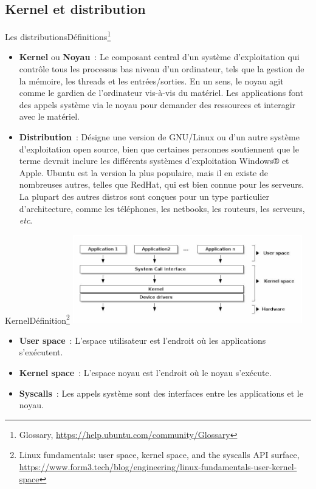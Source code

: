 \documentclass{beamer}
\begin{document}
    \subsection{Kernel et distribution}\label{subsec:kernel-et-distribution}

    \begin{frame}{Les distributions}{Définitions\footnote{Glossary, \url{https://help.ubuntu.com/community/Glossary}}}
        \begin{itemize}
            \item \textbf{Kernel} ou \textbf{Noyau}~: Le composant central d'un système d'exploitation qui contrôle tous les processus bas niveau d'un ordinateur, tels que la gestion de la mémoire, les threads et les entrées/sorties.
            En un sens, le noyau agit comme le gardien de l'ordinateur vis-à-vis du matériel.
            Les applications font des appels système via le noyau pour demander des ressources et interagir avec le matériel.
            \item \textbf{Distribution}~: Désigne une version de GNU/Linux ou d'un autre système d'exploitation open source, bien que certaines personnes soutiennent que le terme devrait inclure les différents systèmes d'exploitation Windows® et Apple.
            Ubuntu est la version la plus populaire, mais il en existe de nombreuses autres, telles que RedHat, qui est bien connue pour les serveurs.
            La plupart des autres distros sont conçues pour un type particulier d'architecture, comme les téléphones, les netbooks, les routeurs, les serveurs, \textit{etc}.
        \end{itemize}
    \end{frame}

    \begin{frame}{Kernel}{Définition\footnote{Linux fundamentals: user space, kernel space, and the syscalls API surface, \url{https://www.form3.tech/blog/engineering/linux-fundamentals-user-kernel-space}}}
        \centering
        \includegraphics[width=10cm]{image/kernel}
        \flushleft
        \begin{itemize}
            \item \textbf{User space}~: L'espace utilisateur est l'endroit où les applications s'exécutent.
            \item \textbf{Kernel space}~: L'espace noyau est l'endroit où le noyau s'exécute.
            \item \textbf{Syscalls}~: Les appels système sont des interfaces entre les applications et le noyau.
        \end{itemize}
    \end{frame}
\end{document}
